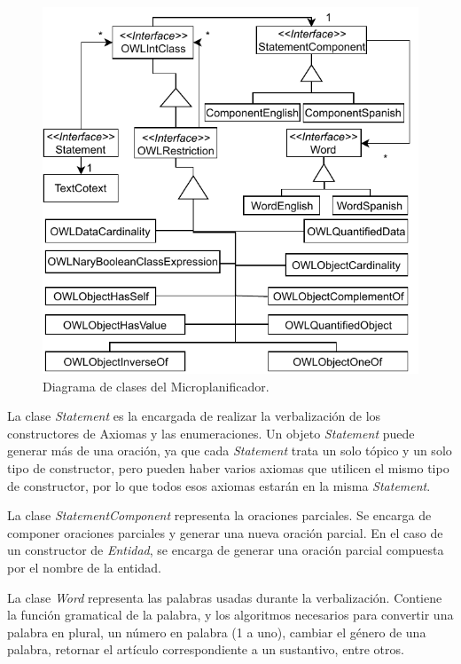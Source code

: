\begin{figure}
    \centering
    \includegraphics{img/generacion_documento/diagrama_clases_microplanificador.pdf}
    \caption{Diagrama de clases del Microplanificador.}
    \label{fig:diagrama_clases_microplanificador}
\end{figure}


La clase \emph{Statement} es la encargada de realizar la verbalización de los constructores de Axiomas y las enumeraciones. Un objeto \emph{Statement} puede generar más de una oración, ya que cada \emph{Statement} trata un solo tópico y un solo tipo de constructor, pero pueden haber varios axiomas que utilicen el mismo tipo de constructor, por lo que todos esos axiomas estarán en la misma \emph{Statement}.

La clase \emph{StatementComponent} representa la oraciones parciales. Se encarga de componer oraciones parciales y generar una nueva oración parcial. En el caso de un constructor de \textit{Entidad}, se encarga de generar una oración parcial compuesta por el nombre de la entidad.

La clase \emph{Word} representa las palabras usadas durante la verbalización. Contiene la función gramatical de la palabra, y los algoritmos necesarios para convertir una palabra en plural, un número en palabra (1 a uno), cambiar el género de una palabra, retornar el artículo correspondiente a un sustantivo, entre otros.

